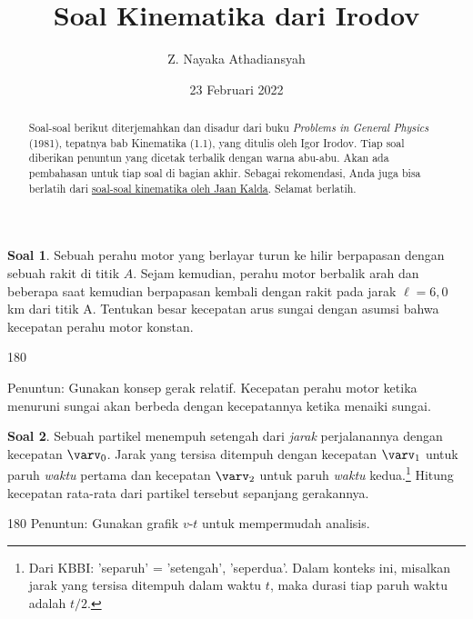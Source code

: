 \documentclass[a4paper, 11.5pt]{article}
\title{\textbf{Soal Kinematika dari Irodov}}
\author{Z. Nayaka Athadiansyah}
\date{23 Februari 2022}
\theoremstyle{definition}
\newtheorem{soal}{Soal}
\begin{document}
\maketitle

\begin{abstract}
	Soal-soal berikut diterjemahkan dan disadur dari buku \emph{Problems in General Physics} (1981), tepatnya bab Kinematika (1.1), yang ditulis oleh Igor Irodov. Tiap soal diberikan penuntun yang dicetak terbalik dengan warna abu-abu. Akan ada pembahasan untuk tiap soal di bagian akhir. Sebagai rekomendasi, Anda juga bisa berlatih dari \href{https://www.ioc.ee/~kalda/ipho/kin_ENG.pdf}{\color{blue} soal-soal kinematika oleh Jaan Kalda}. Selamat berlatih.
\end{abstract}

\begin{soal}
	Sebuah perahu motor yang berlayar turun ke hilir berpapasan dengan sebuah rakit di titik $A$. Sejam kemudian, perahu motor berbalik arah dan beberapa saat kemudian berpapasan kembali dengan rakit pada jarak $\ell = 6{,}0$ km dari titik A. Tentukan besar kecepatan arus sungai dengan asumsi bahwa kecepatan perahu motor konstan.
\end{soal}

\begin{flushright}
	\begin{rotate}{180}
		\begin{minipage}{\linewidth}
			\color{lightgray}
			Penuntun: Gunakan konsep gerak relatif. Kecepatan perahu motor ketika menuruni sungai akan berbeda dengan kecepatannya ketika menaiki sungai.
		\end{minipage}
	\end{rotate}	
\end{flushright}
\vspace{.2em}

\begin{soal}
	Sebuah partikel menempuh setengah dari \textit{jarak} perjalanannya dengan kecepatan $\varv_0$. Jarak yang tersisa ditempuh dengan kecepatan $\varv_1$ untuk paruh \textit{waktu} pertama dan kecepatan $\varv_2$ untuk paruh \textit{waktu} kedua.\footnote{Dari KBBI: 'separuh' = 'setengah', 'seperdua'. Dalam konteks ini, misalkan jarak yang tersisa ditempuh dalam waktu $t$, maka durasi tiap paruh waktu adalah $t/2$.} Hitung kecepatan rata-rata dari partikel tersebut sepanjang gerakannya.
\end{soal}

\begin{flushright}
	\begin{turn}{180}
		\color{lightgray}
		Penuntun: Gunakan grafik $v$-$t$ untuk mempermudah analisis.
	\end{turn}
\end{flushright}
\end{document}

